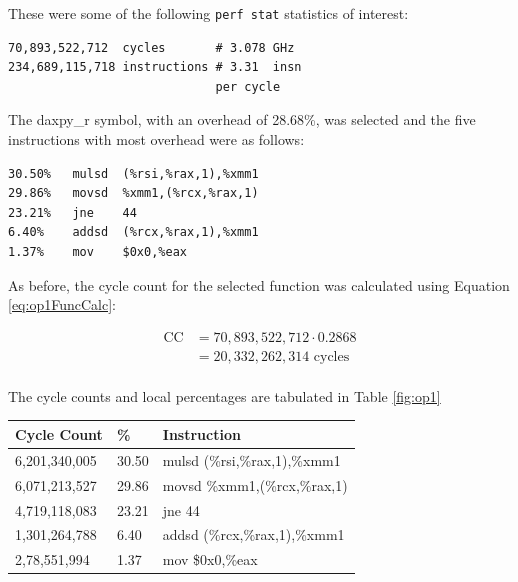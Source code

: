 \documentclass[twocolumn]{article}
\newcommand{\cc}[1]{\texttt{#1}}
\begin{document}
These were some of the following \cc{perf stat} statistics of interest:

\begin{verbatim}
70,893,522,712  cycles       # 3.078 GHz                    
234,689,115,718 instructions # 3.31  insn 
                             per cycle      
\end{verbatim}

The daxpy\_r symbol, with an overhead of 28.68\%, was selected and the five instructions with most overhead
were as follows: 

\begin{verbatim}
30.50%   mulsd  (%rsi,%rax,1),%xmm1
29.86%   movsd  %xmm1,(%rcx,%rax,1)
23.21%   jne    44 
6.40%    addsd  (%rcx,%rax,1),%xmm1
1.37%    mov    $0x0,%eax
\end{verbatim}

As before, the cycle count for the selected function was calculated using Equation \ref{eq:op1FuncCalc}: 

\begin{equation}
    \begin{split}
        \text{CC} & = 70,893,522,712 \cdot 0.2868  \\ 
        & = 20,332,262,314 \text{ cycles}\\
    \end{split}
    \label{eq:op1FuncCalc}
\end{equation}

The cycle counts and local percentages are tabulated in Table \ref{fig:op1}\\

\begingroup
    \medskip
    \centering
    \def\arraystretch{1.5}
        \scriptsize{
        \begin{tabular}{lll}
            \toprule
            Cycle Count & \% & Instruction\\
            \midrule
            6,201,340,005 & 30.50 & mulsd  (\%rsi,\%rax,1),\%xmm1 \\
            6,071,213,527 & 29.86 & movsd   \%xmm1,(\%rcx,\%rax,1) \\
            4,719,118,083 & 23.21 & jne 44 \\
            1,301,264,788 & 6.40 & addsd  (\%rcx,\%rax,1),\%xmm1 \\
            2,78,551,994 & 1.37 & mov    \$0x0,\%eax \\
            \bottomrule
        \end{tabular}
        }
    \label{fig:op1}
    \medskip
\endgroup
\end{document}
